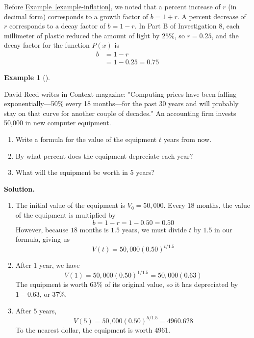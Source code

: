 \documentclass[10pt,]{book}
\theoremstyle{plain}
\theoremstyle{definition}
\theoremstyle{definition}
\theoremstyle{definition}
\newtheorem{example}[theorem]{Example}
\theoremstyle{definition}
\theoremstyle{definition}
\numberwithin{equation}{section}
\newcommand{\amp}{ & }
\begin{document}
    Before \hyperref[example-inflation]{Example~\ref{example-inflation}}, we noted that a percent increase of \(r\) (in decimal form) corresponds to a growth factor of \(b = 1 + r\). A percent decrease of \(r\) corresponds to a decay factor of \(b = 1 − r\). In Part B of Investigation 8, each millimeter of plastic reduced the amount of light by \(25\)\%, so \(r = 0.25\), and the decay factor for the function \(P(x)\) is
    \begin{align*}
    b \amp = 1 − r \\
    \amp= 1 − 0.25 = 0.75
    \end{align*}
%
\begin{example}[]\label{example-computing-prices}

    David Reed writes in Context magazine: "Computing prices have been falling exponentially—50\% every 18 months—for the past 30 years and will probably stay on that curve for another couple of decades." An accounting firm invests \textdollar{}50,000 in new computer equipment.
    \leavevmode%
\begin{enumerate}[label=*\alph**]
\item\hypertarget{li-639}{}
            Write a formula for the value of the equipment \(t\) years from now.
        \item\hypertarget{li-640}{}
            By what percent does the equipment depreciate each year?
        \item\hypertarget{li-641}{}
            What will the equipment be worth in \(5\) years?
        \end{enumerate}

%
\par\medskip\noindent%
\textbf{Solution.}\quad \leavevmode%
\begin{enumerate}[label=*\alph**]
\item\hypertarget{li-642}{}
        The initial value of the equipment is \(V_0 = 50,000\). Every \(18\) months, the value of the equipment is multiplied by
        \begin{equation*}b = 1 − r = 1 − 0.50 = 0.50\end{equation*}
        However, because \(18\) months is \(1.5\) years, we must divide \(t\) by \(1.5\) in our formula, giving us
        \begin{equation*}V(t) = 50,000(0.50)^{t/1.5}\end{equation*}\item\hypertarget{li-643}{}
        After \(1\) year, we have
        \begin{equation*}V(1) = 50,000(0.50)^{1/1.5} = 50,000(0.63)\end{equation*}
        The equipment is worth \(63\)\% of its original value, so it has depreciated by \(1 − 0.63\), or \(37\)\%.
    \item\hypertarget{li-644}{}
        After \(5\) years,
        \begin{equation*}V(5) = 50,000(0.50)^{5/1.5} = 4960.628\end{equation*}
        To the nearest dollar, the equipment is worth \textdollar{}4961.
    \end{enumerate}
\end{example}
\end{document}
